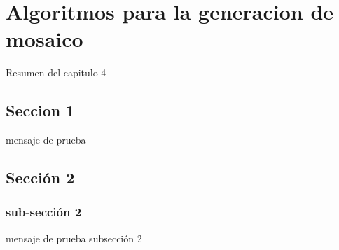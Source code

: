 \chapter{Algoritmos para la generacion de mosaico}
\label{capitulo4}

Resumen del capitulo 4

\section{Seccion 1}
mensaje de prueba

\section{Sección 2}
\subsection{sub-sección 2}
mensaje de prueba subsección 2


